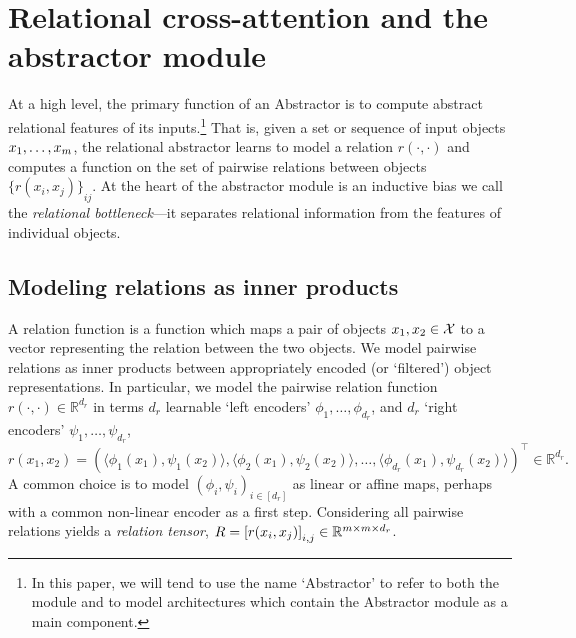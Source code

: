 \section{Relational cross-attention and the abstractor module}\label{sec:abstractor_module}

At a high level, the primary function of an Abstractor is to compute abstract relational features of its inputs.\footnote{In this paper, we will tend to use the name `Abstractor' to refer to both the module and to model architectures which contain the Abstractor module as a main component.} That is, given a set or sequence of input objects $x_1, \ldots, x_m$, the relational abstractor learns to model a relation $r(\cdot, \cdot)$ and computes a function on the set of pairwise relations between objects ${\{ r(x_i, x_j) \}}_{ij}$. At the heart of the abstractor module is an inductive bias we call the \textit{relational bottleneck}---it separates relational information from the features of individual objects.


\subsection{Modeling relations as inner products}\label{ssec:relations_as_inner_prods}

A relation function is a function which maps a pair of objects $x_1, x_2 \in {\mathcal{X}}$ to a vector representing the relation between the two objects. We model pairwise relations as inner products between appropriately encoded (or `filtered') object representations. In particular, we model the pairwise relation function $r(\cdot, \cdot) \in \mathbb{R}^{d_r}$ in terms $d_r$ learnable `left encoders' $\phi_1, \ldots, \phi_{d_r}$, and $d_r$ `right encoders' $\psi_1, \ldots, \psi_{d_r}$,
\begin{equation}\label{eq:inner_prod_rel}
    r(x_1,x_2) = \left(\langle \phi_1(x_1), \psi_1(x_2) \rangle, \langle \phi_2(x_1), \psi_2(x_2) \rangle, \ldots, \langle \phi_{d_r}(x_1), \psi_{d_r}(x_2) \rangle \right)^\top \in \mathbb{R}^{d_r}.
\end{equation}
A common choice is to model $(\phi_i, \psi_i)_{i\in [d_r]}$ as linear or affine maps, perhaps with a common non-linear encoder as a first step. Considering all pairwise relations yields a \textit{relation tensor}, $R = \left[r(x_i, x_j)\right]_{i,j} \in \mathbb{R}^{m \times m \times d_r}$.


